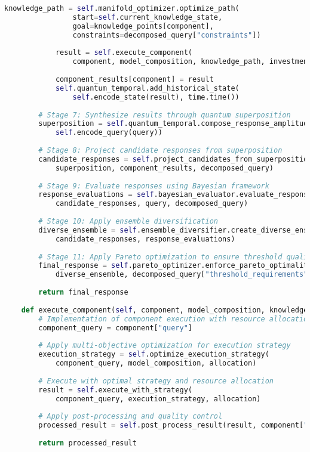 \documentclass[journal,onecolumn]{IEEEtran}
\begin{document}
\begin{lstlisting}[language=Python, caption=CDKS Implementation Pseudocode]
            knowledge_path = self.manifold_optimizer.optimize_path(
                start=self.current_knowledge_state,
                goal=knowledge_points[component],
                constraints=decomposed_query["constraints"])
            
            result = self.execute_component(
                component, model_composition, knowledge_path, investment["allocation"])
                
            component_results[component] = result
            self.quantum_temporal.add_historical_state(
                self.encode_state(result), time.time())
        
        # Stage 7: Synthesize results through quantum superposition
        superposition = self.quantum_temporal.compose_response_amplitudes(
            self.encode_query(query))
        
        # Stage 8: Project candidate responses from superposition
        candidate_responses = self.project_candidates_from_superposition(
            superposition, component_results, decomposed_query)
            
        # Stage 9: Evaluate responses using Bayesian framework
        response_evaluations = self.bayesian_evaluator.evaluate_responses(
            candidate_responses, query, decomposed_query)
            
        # Stage 10: Apply ensemble diversification
        diverse_ensemble = self.ensemble_diversifier.create_diverse_ensemble(
            candidate_responses, response_evaluations)
            
        # Stage 11: Apply Pareto optimization to ensure threshold quality
        final_response = self.pareto_optimizer.enforce_pareto_optimality(
            diverse_ensemble, decomposed_query["threshold_requirements"])
            
        return final_response
        
    def execute_component(self, component, model_composition, knowledge_path, allocation):
        # Implementation of component execution with resource allocation
        component_query = component["query"]
        
        # Apply multi-objective optimization for execution strategy
        execution_strategy = self.optimize_execution_strategy(
            component_query, model_composition, allocation)
            
        # Execute with optimal strategy and resource allocation
        result = self.execute_with_strategy(
            component_query, execution_strategy, allocation)
            
        # Apply post-processing and quality control
        processed_result = self.post_process_result(result, component["completion_criteria"])
        
        return processed_result
\end{lstlisting}
\end{document}

